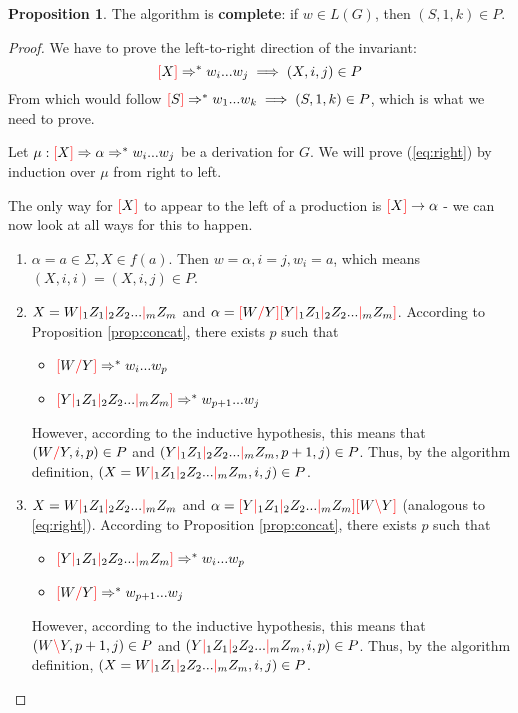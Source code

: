 \documentclass[12pt]{extarticle}
\theoremstyle{definition} \newtheorem{defn}{Definition}
\theoremstyle{definition} \newtheorem{prop}{Proposition}
\theoremstyle{definition} \newtheorem{property}{Property}
\newcommand{\lc}{\textcolor{red}{\backslash}}
\newcommand{\rc}{\textcolor{red}{/}}
\newcommand{\mc}{\textcolor{red}{|}}
\newcommand{\lb}{\textcolor{red}{[}}
\newcommand{\rb}{\textcolor{red}{]}}
\begin{document}
\begin{prop}
    The algorithm is \textbf{complete}: if $w \in L(G)$, then $(S, 1, k) \in P$.
\end{prop}
\begin{proof}
    We have to prove the left-to-right direction of the invariant:
    \begin{equation}\label{eq:right}
        \lb X \rb \Rightarrow^* w_i ... w_j \implies (X, i, j) \in P
    \end{equation}
    From which would follow $ \lb S \rb \Rightarrow^* w_1 ... w_k \implies (S, 1, k) \in P$,
    which is what we need to prove.

    Let $\mu: \lb X \rb \Rightarrow \alpha \Rightarrow^* w_i ... w_j$
    be a derivation for $G$. We will prove (\ref{eq:right}) by induction over
    $\mu$ from right to left.

    The only way for $\lb X \rb$ to appear to the left
    of a production is $\lb X \rb \rightarrow \alpha$ - we can now look at
    all ways for this to happen.
    \begin{enumerate}
        \item $\alpha = a \in \Sigma, X \in f(a)$. Then $w = \alpha, i = j, w_i = a$,
            which means $(X, i, i) = (X, i, j) \in P$.
        \item $X = W \mc_1 Z_1 \mc_2 Z_2 ... \mc_m Z_m$ and
            $\alpha = \lb W \rc Y \rb \lb Y \mc_1 Z_1 \mc_2 Z_2 ... \mc_m Z_m \rb$.
            According to Proposition \ref{prop:concat}, there exists $p$ such that
            \begin{itemize}
                \item $\lb W \rc Y \rb \Rightarrow^* w_i ... w_p$
                \item $\lb Y \mc_1 Z_1 \mc_2 Z_2 ... \mc_m Z_m \rb \Rightarrow^* w_{p+1} ... w_j$
            \end{itemize}
            However, according to the inductive hypothesis, this means that
            $(W \rc Y, i, p) \in P$ and
            $(Y \mc_1 Z_1 \mc_2 Z_2 ... \mc_m Z_m, p + 1, j) \in P$. Thus,
            by the algorithm definition,
            $(X = W \mc_1 Z_1 \mc_2 Z_2 ... \mc_m Z_m, i, j) \in P$.
        \item $X = W \mc_1 Z_1 \mc_2 Z_2 ... \mc_m Z_m$ and
            $\alpha = \lb Y \mc_1 Z_1 \mc_2 Z_2 ... \mc_m Z_m \rb \lb W \lc Y \rb$
            (analogous to \ref{eq:right}).
            According to Proposition \ref{prop:concat}, there exists $p$ such that
            \begin{itemize}
                \item $\lb Y \mc_1 Z_1 \mc_2 Z_2 ... \mc_m Z_m \rb \Rightarrow^* w_i ... w_p$
                \item $\lb W \rc Y \rb \Rightarrow^* w_{p + 1} ... w_j$
            \end{itemize}
            However, according to the inductive hypothesis, this means that
            $(W \lc Y, p + 1, j) \in P$ and
            $(Y \mc_1 Z_1 \mc_2 Z_2 ... \mc_m Z_m, i, p) \in P$. Thus,
            by the algorithm definition,
            $(X = W \mc_1 Z_1 \mc_2 Z_2 ... \mc_m Z_m, i, j) \in P$.
    \end{enumerate}


\end{proof}
\end{document}

